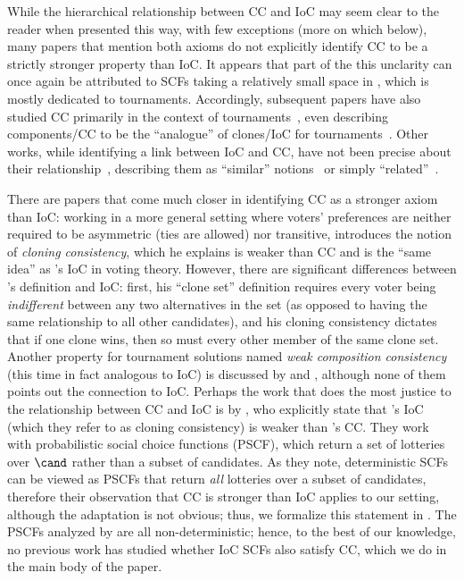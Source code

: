 While the hierarchical relationship between CC and IoC may seem clear to the reader when presented this way, with few exceptions (more on which below), many papers that mention both axioms do not explicitly identify CC to be a strictly stronger property than IoC. It appears that part of the this unclarity can once again be attributed to SCFs taking a relatively small space in \citet{Laffond96:Composition}, which is mostly dedicated to tournaments. Accordingly, subsequent papers have also studied CC primarily in the context of tournaments~\citep{Cornaz13:Kemeny,Brandt11:Fixed,Brandt18:Extending}, even describing components/CC to be the ``analogue'' of clones/IoC for tournaments~\citep{Elkind11:Cloning,Dellis13:Multiple,Karpov22:Symmetric}. Other works, while identifying a link between IoC and CC, have not been precise about their relationship~\citep{Brandt09:Some,Öztürk20:Consistency,Koray07:Self,Laslier12:Loser,Lederer24:Bivariate,Saitoh22:Characterization,Elkind17:What,Camps12:Continuous,Laslier16:Strategic}, describing them as ``similar'' notions~\citep{Laslier97:Tournament,Heitzig10:Some} or simply ``related''~\citep{Brandt11:Fixed}.

There are papers that come much closer in identifying CC as a stronger axiom than IoC: working in a more general setting where voters' preferences are neither required to be asymmetric (ties are allowed)  nor transitive, \citet{Laslier00:Aggregation} introduces the notion of \textit{cloning consistency}, which he explains is weaker than CC and is the ``same idea'' as \citeauthor{Tideman87:Independence}'s IoC in voting theory. However, there are significant differences between \citeauthor{Laslier00:Aggregation}'s definition and IoC: first, his ``clone set'' definition requires every voter being \textit{indifferent} between any two alternatives in the set (as opposed to having the same relationship to all other candidates), and his cloning consistency dictates that if one clone wins, then so must every other member of the same clone set. Another property for tournament solutions named \emph{weak composition consistency} (this time in fact analogous to IoC) is discussed by \citet{Brandt18:Extending,Kruger18:Permutation} and \citet{Laslier97:Tournament}, although none of them points out the connection to IoC. Perhaps the work that does the most justice to the relationship between CC and IoC is  by \citet{Brandl16:Consistent}, who explicitly state that \citeauthor{Tideman87:Independence}'s IoC (which they refer to as cloning consistency) is weaker than \citeauthor{Laffond96:Composition}'s CC. They work with probabilistic social choice functions (PSCF), which return a set of lotteries over $\cand$ rather than a subset of candidates. As they note, deterministic SCFs can be viewed as PSCFs that return \emph{all} lotteries over a subset of candidates, therefore their observation that CC is stronger than IoC applies to our setting, although the adaptation is not obvious; thus, we formalize this statement in . The PSCFs analyzed by \citeauthor{Brandl16:Consistent} are all non-deterministic; hence, to the best of our knowledge, no previous work has studied whether IoC SCFs also satisfy CC, which we do in the main body of the paper.




